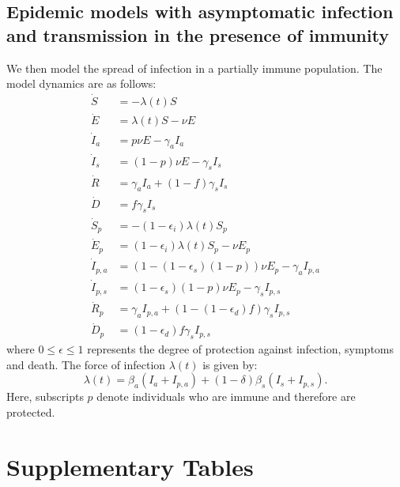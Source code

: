 \documentclass[12pt]{article}
\begin{document}
\subsection*{Epidemic models with asymptomatic infection and transmission in the presence of immunity}

We then model the spread of infection in a partially immune population.
The model dynamics are as follows:
\begin{align}
\dot{S} &= -\lambda (t) S \\
\dot{E} &= \lambda (t) S - \nu E\\
\dot{I}_a &= p \nu E - \gamma_a I_a\\
\dot{I}_s &= (1-p) \nu E -\gamma_s I_s\\
\dot{R} &= \gamma_a I_a + (1-f) \gamma_s I_s \\
\dot{D} &= f \gamma_s I_s\\
\dot{S}_p &= - (1-\epsilon_i) \lambda (t) S_p \\
\dot{E}_p &= (1-\epsilon_i) \lambda (t) S_p - \nu E_p\\
\dot{I}_{p, a} &= (1 - (1-\epsilon_s) (1-p)) \nu E_p - \gamma_a I_{p,a}\\
\dot{I}_{p, s} &= (1-\epsilon_s) (1-p) \nu E_p -\gamma_s I_{p,s}\\
\dot{R}_p &= \gamma_a I_{p,a} + (1-(1-\epsilon_d) f) \gamma_s I_{p,s} \\
\dot{D}_p &= (1-\epsilon_d) f \gamma_s I_{p,s}
\end{align}
where $0\leq \epsilon \leq 1$ represents the degree of protection against infection, symptoms and death. 
The force of infection $\lambda(t)$ is given by:
\begin{equation}
\lambda(t) = \beta_a (I_a + I_{p,a}) + (1-\delta) \beta_s (I_s + I_{p,s}).
\end{equation}
Here, subscripts $p$ denote individuals who are immune and therefore are protected.

\pagebreak

\section*{Supplementary Tables}
\end{document}
